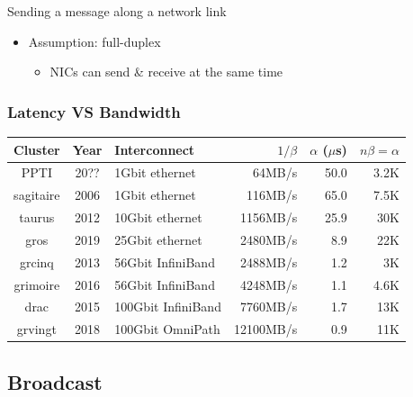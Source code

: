 \documentclass[xcolor={rgb,x11names,svgnames},rgb,x11names,svgnames]{beamer}
\begin{document}
\begin{frame}
\begin{block}{Sending a message along a network link}
\begin{itemize}
      \medskip

    \item Assumption: \alert{full-duplex}
      \begin{itemize}
      \item NICs can send \& receive at the same time
      \end{itemize}
    \end{itemize}
  \end{block}
\end{frame}


\begin{frame}
  \frametitle{Latency VS Bandwidth}
  
\footnotesize 
\begin{tabular}{|c|c|l|r|r|r|}
  \hline
  Cluster   &  Year & Interconnect & $1/\beta$ & $\alpha$ ($\mu$s) & $n\beta = \alpha$ \\
  \hline
  \hline
  PPTI      &  20?? & \phantom{00}1Gbit ethernet &    64MB/s & 50.0   & 3.2K \\
  sagitaire &  2006 & \phantom{00}1Gbit ethernet   &   116MB/s & 65.0 & 7.5K \\
  taurus    &  2012 & \phantom{0}10Gbit ethernet   &  1156MB/s & 25.9 & 30K  \\
  gros      &  2019 & \phantom{0}25Gbit ethernet   &  2480MB/s & 8.9  & 22K  \\
  \hline
  grcinq    &  2013 & \phantom{0}56Gbit InfiniBand &  2488MB/s & 1.2 & 3K    \\
  grimoire  &  2016 & \phantom{0}56Gbit InfiniBand &  4248MB/s & 1.1 & 4.6K  \\
  drac      &  2015 & 100Gbit InfiniBand        &  7760MB/s & 1.7    & 13K   \\
  \hline
  grvingt   &  2018 & 100Gbit OmniPath             & 12100MB/s & 0.9 & 11K   \\
  \hline
\end{tabular}

\end{frame}


\subsection{Broadcast}
\end{document}
